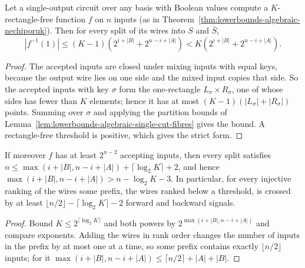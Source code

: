 \begin{theorem}
  \label{thm:lowerbounds-algebraic-single-cut}
  \leanok
  Let a single-output circuit over any basis with Boolean values compute a
  $K$-rectangle-free function $f$ on $n$ inputs (as in
  Theorem~\ref{thm:lowerbounds-algebraic-nechiporuk}). Then for every split
  of its wires into $S$ and $\bar S$,
  \[
    |f^{-1}(1)| \le (K - 1)\left(2^{i + |B|} + 2^{n - i + |A|}\right)
      < K\left(2^{i + |B|} + 2^{n - i + |A|}\right).
  \]
\end{theorem}
\begin{proof}
  \leanok
  The accepted inputs are closed under mixing inputs with equal keys, because
  the output wire lies on one side and the mixed input copies that side. So
  the accepted inputs with key $\sigma$ form the one-rectangle
  $L_\sigma \times R_\sigma$, one of whose sides has fewer than $K$ elements;
  hence it has at most $(K - 1)(|L_\sigma| + |R_\sigma|)$ points. Summing
  over $\sigma$ and applying the partition bounds of
  Lemma~\ref{lem:lowerbounds-algebraic-single-cut-fibres} gives the bound.
  A rectangle-free threshold is positive, which gives the strict form.
\end{proof}

\begin{corollary}
  \label{cor:lowerbounds-algebraic-single-cut}
  \leanok
  If moreover $f$ has at least $2^{n - 2}$ accepting inputs, then every split
  satisfies $n \le \max(i + |B|, n - i + |A|) + \lceil \log_2 K \rceil + 2$,
  and hence $\max(i + |B|, n - i + |A|) > n - \log_2 K - 3$. In particular,
  for every injective ranking of the wires some prefix, the wires ranked
  below a threshold, is crossed by at least
  $\lfloor n/2 \rfloor - \lceil \log_2 K \rceil - 2$ forward and backward
  signals.
\end{corollary}
\begin{proof}
  \leanok
  Bound $K \le 2^{\lceil \log_2 K \rceil}$ and both powers by
  $2^{\max(i + |B|, n - i + |A|)}$ and compare exponents. Adding the wires in
  rank order changes the number of inputs in the prefix by at most one at a
  time, so some prefix contains exactly $\lfloor n/2 \rfloor$ inputs; for it
  $\max(i + |B|, n - i + |A|) \le \lceil n/2 \rceil + |A| + |B|$.
\end{proof}

